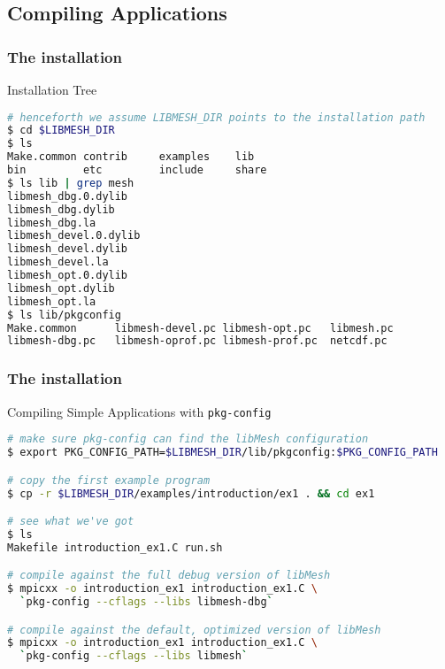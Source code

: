 \subsection{Compiling Applications}
\frame
{
  \Large
  \begin{block}{}
  \end{block}
}



\begin{frame}
  \frametitle{The \libMesh{} installation}

  \begin{block}{Installation Tree}
    \begin{lstlisting}[language=bash]
# henceforth we assume LIBMESH_DIR points to the installation path
$ cd $LIBMESH_DIR
$ ls
Make.common contrib     examples    lib
bin         etc         include     share
$ ls lib | grep mesh
libmesh_dbg.0.dylib
libmesh_dbg.dylib
libmesh_dbg.la
libmesh_devel.0.dylib
libmesh_devel.dylib
libmesh_devel.la
libmesh_opt.0.dylib
libmesh_opt.dylib
libmesh_opt.la
$ ls lib/pkgconfig
Make.common      libmesh-devel.pc libmesh-opt.pc   libmesh.pc
libmesh-dbg.pc   libmesh-oprof.pc libmesh-prof.pc  netcdf.pc
    \end{lstlisting}
  \end{block}
\end{frame}



\begin{frame}
  \frametitle{The \libMesh{} installation}

  \begin{block}{Compiling Simple Applications with \texttt{pkg-config}}
    \begin{lstlisting}[language=bash]
# make sure pkg-config can find the libMesh configuration
$ export PKG_CONFIG_PATH=$LIBMESH_DIR/lib/pkgconfig:$PKG_CONFIG_PATH

# copy the first example program
$ cp -r $LIBMESH_DIR/examples/introduction/ex1 . && cd ex1

# see what we've got
$ ls
Makefile introduction_ex1.C run.sh

# compile against the full debug version of libMesh
$ mpicxx -o introduction_ex1 introduction_ex1.C \
  `pkg-config --cflags --libs libmesh-dbg`

# compile against the default, optimized version of libMesh
$ mpicxx -o introduction_ex1 introduction_ex1.C \
  `pkg-config --cflags --libs libmesh`
    \end{lstlisting}
  \end{block}
\end{frame}






